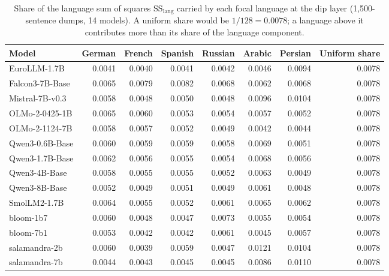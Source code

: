 \documentclass{article} %
\newcommand{\SSl}{\mathrm{SS}_{\mathrm{lang}}}
\begin{document}
\begin{table}[h]
\end{table}
\begin{table}[h]\caption{Share of the language sum of squares $\SSl$ carried by each focal language at the dip layer (1,500-sentence dumps, 14 models). A uniform share would be $1/128 = 0.0078$; a language above it contributes more than its share of the language component.}\label{tab:focal_share}
\begin{center}\scriptsize
\begin{tabular}{lrrrrrrr}
\toprule
Model & German & French & Spanish & Russian & Arabic & Persian & Uniform share \\
\midrule
EuroLLM-1.7B & 0.0041 & 0.0040 & 0.0041 & 0.0042 & 0.0046 & 0.0094 & 0.0078 \\
Falcon3-7B-Base & 0.0065 & 0.0079 & 0.0082 & 0.0068 & 0.0062 & 0.0068 & 0.0078 \\
Mistral-7B-v0.3 & 0.0058 & 0.0048 & 0.0050 & 0.0048 & 0.0096 & 0.0104 & 0.0078 \\
OLMo-2-0425-1B & 0.0065 & 0.0060 & 0.0053 & 0.0054 & 0.0057 & 0.0052 & 0.0078 \\
OLMo-2-1124-7B & 0.0058 & 0.0057 & 0.0052 & 0.0049 & 0.0042 & 0.0044 & 0.0078 \\
Qwen3-0.6B-Base & 0.0060 & 0.0059 & 0.0059 & 0.0058 & 0.0069 & 0.0051 & 0.0078 \\
Qwen3-1.7B-Base & 0.0062 & 0.0056 & 0.0055 & 0.0054 & 0.0068 & 0.0056 & 0.0078 \\
Qwen3-4B-Base & 0.0058 & 0.0055 & 0.0055 & 0.0052 & 0.0063 & 0.0049 & 0.0078 \\
Qwen3-8B-Base & 0.0052 & 0.0049 & 0.0051 & 0.0049 & 0.0061 & 0.0048 & 0.0078 \\
SmolLM2-1.7B & 0.0064 & 0.0055 & 0.0052 & 0.0061 & 0.0065 & 0.0062 & 0.0078 \\
bloom-1b7 & 0.0060 & 0.0048 & 0.0047 & 0.0073 & 0.0055 & 0.0054 & 0.0078 \\
bloom-7b1 & 0.0053 & 0.0042 & 0.0042 & 0.0061 & 0.0045 & 0.0057 & 0.0078 \\
salamandra-2b & 0.0060 & 0.0039 & 0.0059 & 0.0047 & 0.0121 & 0.0104 & 0.0078 \\
salamandra-7b & 0.0044 & 0.0043 & 0.0045 & 0.0045 & 0.0086 & 0.0110 & 0.0078 \\
\bottomrule
\end{tabular}
\end{center}

\end{table}
\end{document}
